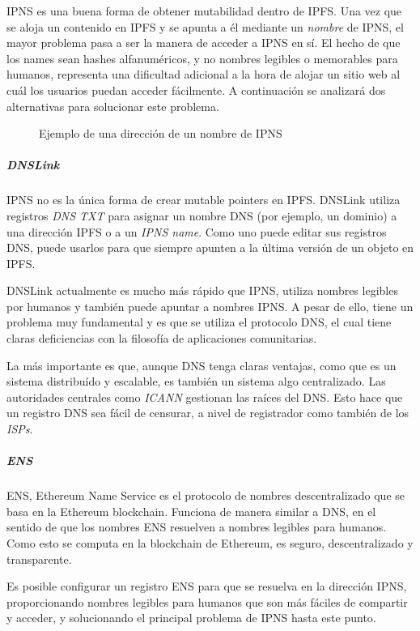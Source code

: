 IPNS es una buena forma de obtener mutabilidad dentro de IPFS. Una vez que se aloja un contenido en IPFS y se apunta a él mediante un \textit{nombre} de IPNS, el mayor problema pasa a ser la manera de acceder a IPNS en sí. El hecho de que los names sean hashes alfanuméricos, y no nombres legibles o memorables para humanos, representa una dificultad adicional a la hora de alojar un sitio web al cuál los usuarios puedan acceder fácilmente. A continuación se analizará dos alternativas para solucionar este problema.

\begin{figure}[h]
\centering
{}
\caption{Ejemplo de una dirección de un nombre de IPNS}
\end{figure}

\subparagraph{DNSLink}

IPNS no es la única forma de crear mutable pointers en IPFS. DNSLink \cite{dnslink} utiliza registros \textit{DNS TXT} para asignar un nombre DNS (por ejemplo, un dominio) a una dirección IPFS o a un \textit{IPNS name}. Como uno puede editar sus registros DNS, puede usarlos para que siempre apunten a la última versión de un objeto en IPFS.

DNSLink actualmente es mucho más rápido que IPNS, utiliza nombres legibles por humanos y también puede apuntar a nombres IPNS. A pesar de ello, tiene un problema muy fundamental y es que se utiliza el protocolo DNS, el cual tiene claras deficiencias con la filosofía de aplicaciones comunitarias.

La más importante es que, aunque DNS tenga claras ventajas, como que es un sistema distribuído y escalable, es también un sistema algo centralizado. Las autoridades centrales como \textit{ICANN} gestionan las raíces del DNS. Esto hace que un registro DNS sea fácil de censurar, a nivel de registrador como también de los \textit{ISPs}.

\subparagraph{ENS}

ENS, Ethereum Name Service es el protocolo de nombres descentralizado que se basa en la Ethereum blockchain. Funciona de manera similar a DNS, en el sentido de que los nombres ENS resuelven a nombres legibles para humanos. Como esto se computa en la blockchain de Ethereum, es seguro, descentralizado y transparente.

Es posible configurar un registro ENS para que se resuelva en la dirección IPNS, proporcionando nombres legibles para humanos que son más fáciles de compartir y acceder, y solucionando el principal problema de IPNS hasta este punto.

